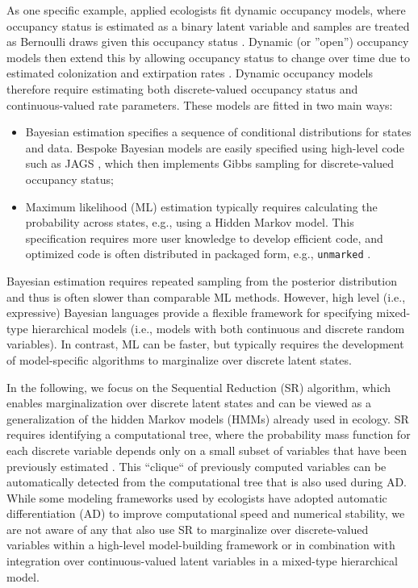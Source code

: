 \documentclass[11pt]{article}
\begin{document}
As one specific example, applied ecologists fit dynamic occupancy models, where occupancy status is estimated as a binary latent variable and samples are treated as Bernoulli draws given this occupancy status \citep{mackenzie_estimating_2002}.  Dynamic (or ''open'') occupancy models then extend this by allowing occupancy status to change over time due to estimated colonization and extirpation rates \citep{mackenzie_estimating_2003}.  Dynamic occupancy models therefore require estimating both discrete-valued occupancy status and continuous-valued rate parameters.  These models are fitted in two main ways:
\begin{itemize}
    \item Bayesian estimation specifies a sequence of conditional distributions for states and data.  Bespoke Bayesian models are easily specified using high-level code such as JAGS \citep{plummer_jags:_2003}, which then implements Gibbs sampling for discrete-valued occupancy status;  
    \item Maximum likelihood (ML) estimation typically requires calculating the probability across states, e.g., using a Hidden Markov model.  This specification requires more user knowledge to develop efficient code, and optimized code is often distributed in packaged form, e.g., \texttt{unmarked} \citep{fiske_unmarked:_2011}. 
\end{itemize}
 Bayesian estimation requires repeated sampling from the posterior distribution and thus is often slower than comparable ML methods. However, high level (i.e., expressive) Bayesian languages provide a flexible framework for specifying mixed-type hierarchical models (i.e., models with both continuous and discrete random variables). In contrast, ML can be faster, but typically requires the development of model-specific algorithms to marginalize over discrete latent states.

In the following, we focus on the Sequential Reduction (SR) algorithm, which enables marginalization over discrete latent states and can be viewed as a generalization of the hidden Markov models (HMMs) already used in ecology.  SR requires identifying a computational tree, where the probability mass function for each discrete variable depends only on a small subset of variables that have been previously estimated \citep{hojsgaard_graphical_2012}.  This ``clique`` of previously computed variables can be automatically detected from the computational tree that is also used during AD.  While some modeling frameworks used by ecologists have adopted automatic differentiation (AD) to improve computational speed and numerical stability, we are not aware of any that also use SR to marginalize over discrete-valued variables within a high-level model-building framework or in combination with integration over continuous-valued latent variables in a mixed-type hierarchical model.
\end{document}
